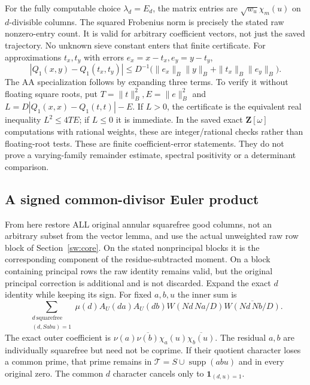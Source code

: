 For the fully computable choice $\lambda_d=E_d$, the matrix entries are
$\sqrt{w_u}\chi_m(u)$ on $d$-divisible columns. The squared Frobenius
norm is precisely the stated raw nonzero-entry count. It is valid for
arbitrary coefficient vectors, not just the saved trajectory. No unknown
sieve constant enters that finite certificate.
For approximations $t_x,t_y$ with errors $e_x=x-t_x,e_y=y-t_y$,
\[
 |Q_1(x,y)-Q_1(t_x,t_y)|
 \le D^{-1}\bigl(\|e_x\|_B\|y\|_B+
                    \|t_x\|_B\|e_y\|_B\bigr).
\]
The AA specialization follows by expanding three terms. To verify it
without floating square roots, put $T=\|t\|_B^2,E=\|e\|_B^2$ and
$L=D|Q_1(x,x)-Q_1(t,t)|-E$.
If $L>0$, the certificate is the equivalent real inequality
$L^2\le4TE$; if $L\le0$ it is immediate. In the saved exact
$\mathbf Z[\omega]$ computations with rational weights, these are
integer/rational checks rather than floating-root tests.
These are finite coefficient-error statements. They do not prove a
varying-family remainder estimate, spectral positivity or a determinant
comparison.

\subsection{A signed common-divisor Euler product}
From here restore ALL original annular squarefree good columns, not an
arbitrary subset from the vector lemma, and use the actual unweighted
raw row block of Section~\ref{sw:core}.
On the stated nonprincipal blocks it is the corresponding component of
the residue-subtracted moment. On a block containing principal rows the
raw identity remains valid, but the original principal correction is
additional and is not discarded.
Expand the exact $d$ identity while keeping its sign. For fixed $a,b,u$
the inner sum is
\begin{equation}\label{sd:inner}
 \sum_{\substack{d\ \mathrm{squarefree}\\(d,Sabu)=1}}
 \mu(d)A_U(da)A_U(db)
       W(Nd\,Na/D)\overline{W(Nd\,Nb/D)}.
\end{equation}
The exact outer coefficient is
$\nu(a)\overline{\nu(b)}\chi_a(u)\overline{\chi_b(u)}$.
The residual $a,b$ are individually squarefree but need not be coprime.
If their quotient character loses a common prime, that prime remains in
$\mathcal T=S\cup\operatorname{supp}(abu)$ and in every original zero.
The common $d$ character cancels only to $\mathbf1_{(d,u)=1}$.

